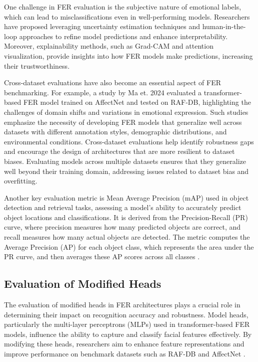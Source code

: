 One challenge in FER evaluation is the subjective nature of emotional labels, which can lead to misclassifications even in well-performing models. Researchers have proposed leveraging uncertainty estimation techniques and human-in-the-loop approaches to refine model predictions and enhance interpretability. Moreover, explainability methods, such as Grad-CAM and attention visualization, provide insights into how FER models make predictions, increasing their trustworthiness.

Cross-dataset evaluations have also become an essential aspect of FER benchmarking. For example, a study by Ma et. 2024 \cite{ma_facial_2023} evaluated a transformer-based FER model trained on AffectNet and tested on RAF-DB, highlighting the challenges of domain shifts and variations in emotional expression. Such studies emphasize the necessity of developing FER models that generalize well across datasets with different annotation styles, demographic distributions, and environmental conditions. Cross-dataset evaluations help identify robustness gaps and encourage the design of architectures that are more resilient to dataset biases. Evaluating models across multiple datasets ensures that they generalize well beyond their training domain, addressing issues related to dataset bias and overfitting. 

Another key evaluation metric is Mean Average Precision (mAP)  used in object detection and retrieval tasks, assessing a model’s ability to accurately predict object locations and classifications. It is derived from the Precision-Recall (PR) curve, where precision measures how many predicted objects are correct, and recall measures how many actual objects are detected. The metric computes the Average Precision (AP) for each object class, which represents the area under the PR curve, and then averages these AP scores across all classes\cite{marcu_pitfalls_2022} \cite{ranjan_light-weight_2018}.

\subsection{Evaluation of Modified Heads}

The evaluation of modified heads in FER architectures plays a crucial role in determining their impact on recognition accuracy and robustness. Model heads, particularly the multi-layer perceptrons (MLPs) used in transformer-based FER models, influence the ability to capture and classify facial features effectively. By modifying these heads, researchers aim to enhance feature representations and improve performance on benchmark datasets such as RAF-DB and AffectNet \cite{zheng_poster_2022}.

